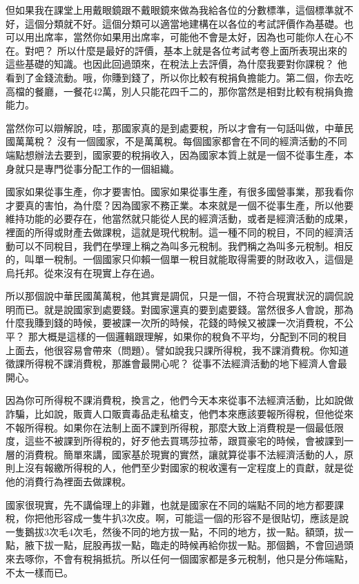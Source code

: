 \documentclass[oneside,sub3section]{ctexbook}
\begin{document}
但如果我在課堂上用戴眼鏡跟不戴眼鏡來做為我給各位的分數標準，這個標準就不好，這個分類就不好。這個分類可以適當地建構在以各位的考試評價作為基礎。也可以用出席率，當然你如果用出席率，可能他不會是太好，因為也可能你人在心不在。對吧？ 所以什麼是最好的評價，基本上就是各位考試考卷上面所表現出來的這些基礎的知識。也因此回過頭來，在稅法上去評價，為什麼我要對你課稅？ 他看到了金錢流動。哦，你賺到錢了，所以你比較有稅捐負擔能力。第二個，你去吃高檔的餐廳，一餐花42萬，別人只能花四千二的，那你當然是相對比較有稅捐負擔能力。

當然你可以辯解說，哇，那國家真的是到處要稅，所以才會有一句話叫做，中華民國萬萬稅？ 沒有一個國家，不是萬萬稅。每個國家都會在不同的經濟活動的不同端點想辦法去要到，國家要的稅捐收入，因為國家本質上就是一個不從事生產，本身就只是專門從事分配工作的一個組織。

國家如果從事生產，你才要害怕。國家如果從事生產，有很多國營事業，那我看你才要真的害怕，為什麼？因為國家不務正業。本來就是一個不從事生產，所以他要維持功能的必要存在，他當然就只能從人民的經濟活動，或者是經濟活動的成果，裡面的所得或財產去做課稅，這就是現代稅制。這一種不同的稅目，不同的經濟活動可以不同稅目，我們在學理上稱之為叫多元稅制。我們稱之為叫多元稅制。相反的，叫單一稅制。一個國家只仰賴一個單一稅目就能取得需要的財政收入，這個是烏托邦。從來沒有在現實上存在過。

所以那個說中華民國萬萬稅，他其實是調侃，只是一個，不符合現實狀況的調侃說明而已。就是說國家到處要錢。對國家還真的要到處要錢。當然很多人會說，那為什麼我賺到錢的時候，要被課一次所的時候，花錢的時候又被課一次消費稅，不公平？ 那大概是這樣的一個邏輯跟理解，如果你的稅負不平均，分配到不同的稅目上面去，他很容易會帶來（問題）。譬如說我只課所得稅，我不課消費稅。你知道徵課所得稅不課消費稅，那誰會最開心呢？ 從事不法經濟活動的地下經濟人會最開心。

因為你可所得稅不課消費稅，換言之，他們今天本來從事不法經濟活動，比如說做詐騙，比如說，販賣人口販賣毒品走私槍支，他們本來應該要報所得稅，但他從來不報所得稅。如果你在法制上面不課到所得稅，那麼大致上消費稅是一個最低限度，這些不被課到所得稅的，好歹他去買瑪莎拉蒂，跟買豪宅的時候，會被課到一層的消費稅。簡單來講，國家基於現實的實然，讓就算從事不法經濟活動的人，原則上沒有報繳所得稅的人，他們至少對國家的稅收還有一定程度上的貢獻，就是從他的消費行為裡面去做課稅。

國家很現實，先不講倫理上的非難，也就是國家在不同的端點不同的地方都要課稅，你把他形容成一隻牛扒3次皮。啊，可能這一個的形容不是很貼切，應該是說一隻鵝拔3次毛4次毛，然後不同的地方拔一點，不同的地方，拔一點。額頭，拔一點，腋下拔一點，屁股再拔一點，臨走的時候再給你拔一點。那個鵝，不會回過頭來去啄你，不會有稅捐抵抗。所以任何一個國家都是多元稅制，他只是分佈端點，不太一樣而已。
\end{document}
